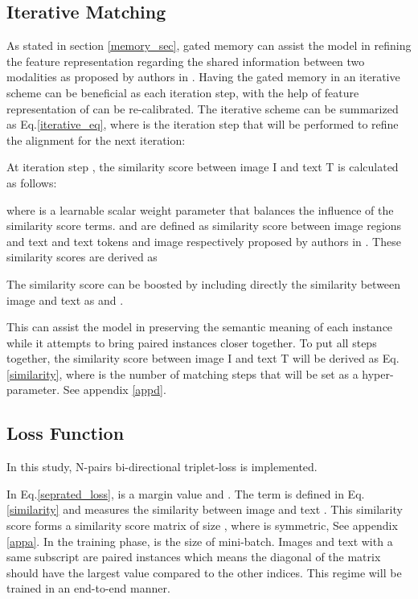 \documentclass{midl}
\begin{document}
\subsection{Iterative Matching}
\label{iterative}
As stated in section \ref{memory_sec}, gated memory can assist the model in refining the feature representation regarding the shared information between two modalities as proposed by authors in \cite{chen2020imram}. Having the gated memory in an iterative scheme can be beneficial as each iteration step, with the help of  feature representation of  can be re-calibrated. The iterative scheme can be summarized as Eq.\ref{iterative_eq}, where  is the iteration step that will be performed to refine the alignment for the next iteration: 


At iteration step , the similarity score between image I and text T is calculated as follows:

where  is a learnable scalar weight parameter that balances the influence of the similarity score terms.  and  are defined as similarity score between image regions and text  and text tokens and image  respectively proposed by authors in \cite{chen2020imram} . These similarity scores are derived as 



The similarity score can be boosted by including directly the similarity between image and text as  and .

This can assist the model in preserving the semantic meaning of each instance while it attempts to bring paired instances closer together.
To put all  steps together, the similarity score between image I and text T will be derived as Eq.\ref{similarity}, where  is the number of matching steps that will be set as a hyper-parameter. See appendix \ref{appd}.



 
\subsection{Loss Function}
\label{loss}
In this study, N-pairs bi-directional triplet-loss is implemented.


In Eq.\ref{seprated_loss},  is a margin value and . The term  is defined in Eq.\ref{similarity} and measures the similarity between image  and text . This similarity score forms a similarity score matrix  of size , where  is symmetric, See appendix \ref{appa}. In the training phase,  is the size of mini-batch. Images and text with a same subscript are paired instances which means the diagonal of the matrix should have the largest value compared to the other indices. This regime will be trained in an end-to-end manner.
\end{document}
